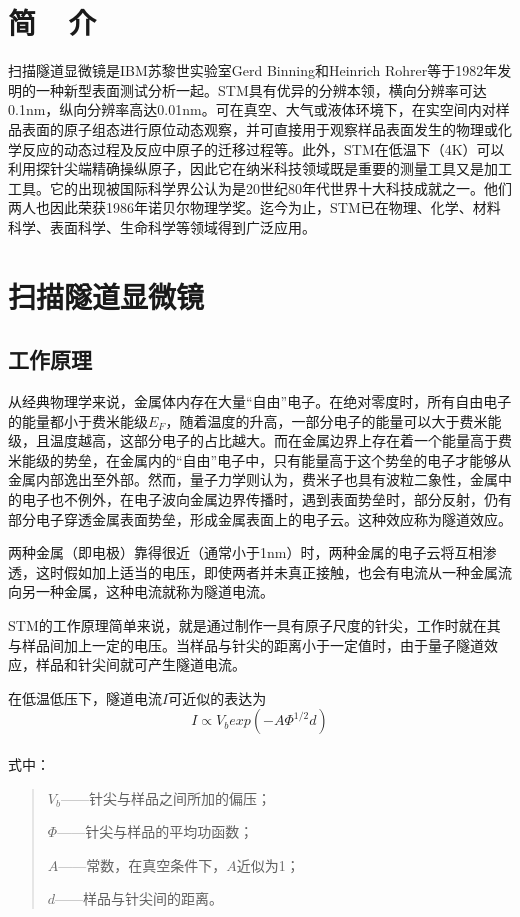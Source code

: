 \documentclass[a4paper, zihao=-4, linespread=1.25]{ctexrep}
\begin{document}

\chapter{简~~介}
扫描隧道显微镜是IBM苏黎世实验室Gerd Binning和Heinrich Rohrer等于1982年发明的一种新型表面测试分析一起。STM具有优异的分辨本领，横向分辨率可达0.1nm，纵向分辨率高达0.01nm。可在真空、大气或液体环境下，在实空间内对样品表面的原子组态进行原位动态观察，并可直接用于观察样品表面发生的物理或化学反应的动态过程及反应中原子的迁移过程等。此外，STM在低温下（4K）可以利用探针尖端精确操纵原子，因此它在纳米科技领域既是重要的测量工具又是加工工具。它的出现被国际科学界公认为是20世纪80年代世界十大科技成就之一。他们两人也因此荣获1986年诺贝尔物理学奖。迄今为止，STM已在物理、化学、材料科学、表面科学、生命科学等领域得到广泛应用。

\chapter{扫描隧道显微镜}
\section{工作原理}
从经典物理学来说，金属体内存在大量“自由”电子。在绝对零度时，所有自由电子的能量都小于费米能级$E_{F}$，随着温度的升高，一部分电子的能量可以大于费米能级，且温度越高，这部分电子的占比越大。而在金属边界上存在着一个能量高于费米能级的势垒，在金属内的“自由”电子中，只有能量高于这个势垒的电子才能够从金属内部逸出至外部。然而，量子力学则认为，费米子也具有波粒二象性，金属中的电子也不例外，在电子波向金属边界传播时，遇到表面势垒时，部分反射，仍有部分电子穿透金属表面势垒，形成金属表面上的电子云。这种效应称为隧道效应。

两种金属（即电极）靠得很近（通常小于1nm）时，两种金属的电子云将互相渗透，这时假如加上适当的电压，即使两者并未真正接触，也会有电流从一种金属流向另一种金属，这种电流就称为隧道电流。

STM的工作原理简单来说，就是通过制作一具有原子尺度的针尖，工作时就在其与样品间加上一定的电压。当样品与针尖的距离小于一定值时，由于量子隧道效应，样品和针尖间就可产生隧道电流。

在低温低压下，隧道电流$I$可近似的表达为\[I\propto V_{b}exp(-A \Phi^{1/2}d)\]\\
式中：
\begin{quote}
	$V_{b}$——针尖与样品之间所加的偏压；

	$\Phi$——针尖与样品的平均功函数；

	$A$——常数，在真空条件下，$A$近似为1；

	$d$——样品与针尖间的距离。
\end{quote}
\end{document}
